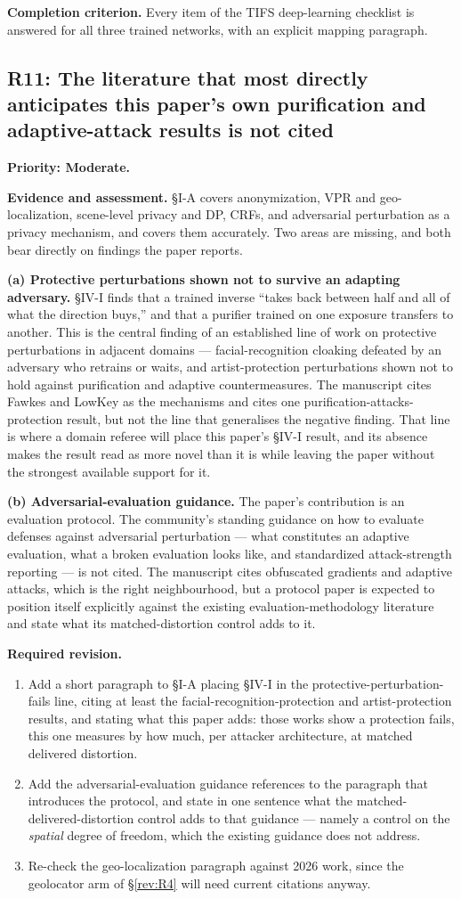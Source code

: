\documentclass[11pt,a4paper]{article}
\newcommand{\finding}[3]{\subsection{#1: #3}\label{rev:#1}\textbf{Priority: #2.}}
\newcommand{\evidence}{\par\textbf{Evidence and assessment.} }
\newcommand{\action}{\par\textbf{Required revision.} }
\newcommand{\acceptance}{\par\textbf{Completion criterion.} }
\begin{document}
\acceptance
Every item of the TIFS deep-learning checklist is answered for all three
trained networks, with an explicit mapping paragraph.

\finding{R11}{Moderate}{The literature that most directly anticipates this
paper's own purification and adaptive-attack results is not cited}

\evidence
\S I-A covers anonymization, VPR and geo-localization, scene-level privacy and
DP, CRFs, and adversarial perturbation as a privacy mechanism, and covers them
accurately. Two areas are missing, and both bear directly on findings the paper
reports.

\textbf{(a) Protective perturbations shown not to survive an adapting
adversary.} \S IV-I finds that a trained inverse ``takes back between half and
all of what the direction buys,'' and that a purifier trained on one exposure
transfers to another. This is the central finding of an established line of
work on protective perturbations in adjacent domains --- facial-recognition
cloaking defeated by an adversary who retrains or waits, and artist-protection
perturbations shown not to hold against purification and adaptive
countermeasures. The manuscript cites Fawkes and LowKey as the mechanisms and
cites one purification-attacks-protection result, but not the line that
generalises the negative finding. That line is where a domain referee will
place this paper's §IV-I result, and its absence makes the result read as more
novel than it is while leaving the paper without the strongest available
support for it.

\textbf{(b) Adversarial-evaluation guidance.} The paper's contribution is an
evaluation protocol. The community's standing guidance on how to evaluate
defenses against adversarial perturbation --- what constitutes an adaptive
evaluation, what a broken evaluation looks like, and standardized
attack-strength reporting --- is not cited. The manuscript cites obfuscated
gradients and adaptive attacks, which is the right neighbourhood, but a protocol
paper is expected to position itself explicitly against the existing
evaluation-methodology literature and state what its matched-distortion control
adds to it.

\action
\begin{enumerate}
\item Add a short paragraph to \S I-A placing \S IV-I in the
  protective-perturbation-fails line, citing at least the
  facial-recognition-protection and artist-protection results, and stating
  what this paper adds: those works show a protection fails, this one measures
  by how much, per attacker architecture, at matched delivered distortion.
\item Add the adversarial-evaluation guidance references to the paragraph that
  introduces the protocol, and state in one sentence what the
  matched-delivered-distortion control adds to that guidance --- namely a
  control on the \emph{spatial} degree of freedom, which the existing guidance
  does not address.
\item Re-check the geo-localization paragraph against 2026 work, since the
  geolocator arm of \S\ref{rev:R4} will need current citations anyway.
\end{enumerate}
\end{document}
